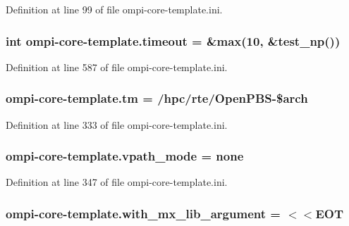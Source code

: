 Definition at line 99 of file ompi-\/core-\/template.\-ini.

\hypertarget{namespaceompi-core-template_a1b604b7ffc5d75bfe90c73ae25da9a3c}{
\subsubsection[{timeout}]{\setlength{\rightskip}{0pt plus 5cm}int ompi-\/core-\/template.\-timeout = \&max(10, \&test\-\_\-np())}}\label{namespaceompi-core-template_a1b604b7ffc5d75bfe90c73ae25da9a3c}


Definition at line 587 of file ompi-\/core-\/template.\-ini.

\hypertarget{namespaceompi-core-template_a33bc188e781bcf5335e314bb324499c4}{
\subsubsection[{tm}]{\setlength{\rightskip}{0pt plus 5cm}ompi-\/core-\/template.\-tm = /hpc/rte/Open\-P\-B\-S-\/\${\bf arch}}}\label{namespaceompi-core-template_a33bc188e781bcf5335e314bb324499c4}


Definition at line 333 of file ompi-\/core-\/template.\-ini.

\hypertarget{namespaceompi-core-template_a9cc0911af42525eed84ffc2ecf620987}{
\subsubsection[{vpath\-\_\-mode}]{\setlength{\rightskip}{0pt plus 5cm}ompi-\/core-\/template.\-vpath\-\_\-mode = none}}\label{namespaceompi-core-template_a9cc0911af42525eed84ffc2ecf620987}


Definition at line 347 of file ompi-\/core-\/template.\-ini.

\hypertarget{namespaceompi-core-template_a961a3e9f58483894d366809baf236a0f}{
\subsubsection[{with\-\_\-mx\-\_\-lib\-\_\-argument}]{\setlength{\rightskip}{0pt plus 5cm}ompi-\/core-\/template.\-with\-\_\-mx\-\_\-lib\-\_\-argument = $<$$<$E\-O\-T}}\label{namespaceompi-core-template_a961a3e9f58483894d366809baf236a0f}


